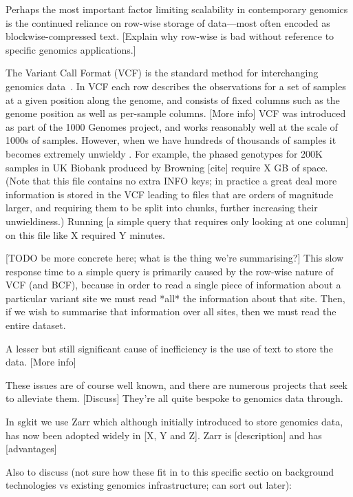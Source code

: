 \documentclass[9pt,lineno]{elife}
\begin{document}
Perhaps the most important factor limiting scalability in contemporary genomics
is the continued reliance on row-wise storage of data---most often
encoded as blockwise-compressed text.
[Explain why row-wise is bad without reference to specific genomics applications.]

The Variant Call Format (VCF) is the standard method for interchanging
genomics data~\citep{danecek2011variant}.
In VCF each row describes the observations for a set of samples
at a given position along the genome, and consists of fixed columns such as the
genome position as well as per-sample columns. [More info]
VCF was introduced as part of the 1000 Genomes project, and works reasonably
well at the scale of 1000s of samples. However, when we have hundreds of
thousands of samples it becomes extremely unwieldy
. For example, the
phased genotypes for 200K samples in UK Biobank produced by Browning [cite]
require X GB of space.
(Note that this file contains no extra INFO keys; in practice a great deal
more information is stored in the VCF leading to files that are orders of
magnitude larger, and requiring them to be split into chunks, further
increasing their unwieldiness.)
Running [a simple query that requires only looking at
one column] on this file like X required Y minutes.

[TODO be more concrete here; what is the thing we're summarising?]
This slow response time to a simple query is primarily caused by the row-wise
nature of VCF (and BCF), because in order to read a single piece of
information about a particular variant site we must read *all* the information
about that site. Then, if we wish to summarise that information over
all sites, then we must read the entire dataset.

A lesser but still significant cause of inefficiency is the use of
text to store the data. [More info]

These issues are of course well known, and there are numerous projects
that seek to alleviate them. [Discuss] They're all quite bespoke to genomics data
through.

In sgkit we use Zarr which although initially introduced to store
genomics data, has now been adopted widely in [X, Y and Z].
Zarr is [description] and has [advantages]

Also to discuss (not sure how these fit in to this specific sectio
on background technologies vs existing genomics infrastructure; can
sort out later):
\end{document}
